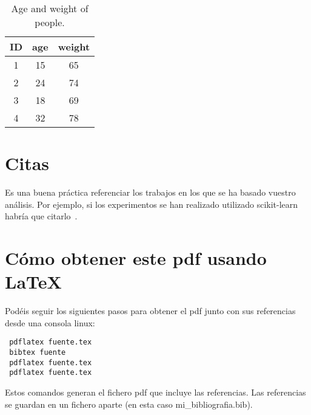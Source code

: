 \documentclass{esannV2}
\begin{document}
\begin{table}[t!]
  \centering
  \begin{tabular}{|c|c|c|}
    \hline
    ID & age & weight \\
    \hline
    1& 15 & 65 \\
    2& 24 & 74\\
    3& 18 & 69 \\
    4& 32 & 78 \\
    \hline
  \end{tabular}
  \caption{Age and weight of people.}\label{tab:ageweight}
\end{table}

\section{Citas}
Es una buena práctica referenciar los trabajos en los que se ha basado vuestro
análisis. Por ejemplo, si los experimentos se han realizado utilizado
scikit-learn habría que citarlo~\cite{scikit-learn}.

\section{Cómo obtener este pdf usando \LaTeX}
Podéis seguir los siguientes pasos para obtener el pdf junto con sus
referencias desde una consola linux:

\begin{lstlisting}
 pdflatex fuente.tex
 bibtex fuente
 pdflatex fuente.tex
 pdflatex fuente.tex
\end{lstlisting}

Estos comandos generan el fichero pdf que incluye las referencias. Las
referencias se guardan en un fichero aparte (en esta caso mi\_bibliografia.bib).
\end{document}
